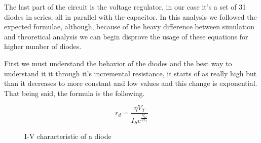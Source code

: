 The last part of the circuit is the voltage regulator, in our case it's a set of 31 diodes in series, all in parallel with the capacitor. In this analysis we followed the expected formulae, although, because of the heavy difference between simulation and theoretical analysis we can begin disprove the usage of these equations for higher number of diodes.

First we must understand the behavior of the diodes and the best way to understand it it through it's incremental resistance, it starts of as really high but than it decreases to more constant and low values and this change is exponential. That being said, the formula is the following. 

\begin{equation}
    r_d = \frac{\eta V_T}{I_S e^{\frac{V_D}{\eta V_T}}}
    \label{eq:rad_mat}
\end{equation}

\begin{figure}[H]
\hspace{-10mm}
  \caption{I-V characteristic of a diode} 
\end{figure}

